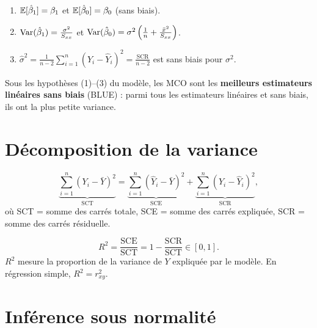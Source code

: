 \begin{theoreme}
\label{thm:mco-props}
\begin{enumerate}
\item $\mathbb{E}[\hat{\beta}_1]=\beta_1$ et $\mathbb{E}[\hat{\beta}_0]=\beta_0$ (sans biais).
\item $\operatorname{Var}(\hat{\beta}_1)=\frac{\sigma^2}{S_{xx}}$ et $\operatorname{Var}(\hat{\beta}_0)=\sigma^2\left(\frac{1}{n}+\frac{\bar{x}^2}{S_{xx}}\right)$.
\item $\hat{\sigma}^2=\frac{1}{n-2}\sum_{i=1}^n(Y_i-\hat{Y}_i)^2=\frac{\mathrm{SCR}}{n-2}$ est sans biais pour $\sigma^2$.
\end{enumerate}
\end{theoreme}

\begin{theoreme}
Sous les hypoth\`eses (1)--(3) du mod\`ele, les MCO sont les \textbf{meilleurs estimateurs lin\'eaires sans biais} (BLUE) : parmi tous les estimateurs lin\'eaires et sans biais, ils ont la plus petite variance.
\end{theoreme}

\section{D\'ecomposition de la variance}

\begin{theoreme}[D\'ecomposition SCT = SCE + SCR]
\[
\underbrace{\sum_{i=1}^n(Y_i-\bar{Y})^2}_{\mathrm{SCT}} = \underbrace{\sum_{i=1}^n(\hat{Y}_i-\bar{Y})^2}_{\mathrm{SCE}} + \underbrace{\sum_{i=1}^n(Y_i-\hat{Y}_i)^2}_{\mathrm{SCR}},
\]
o\`u SCT = somme des carr\'es totale, SCE = somme des carr\'es expliqu\'ee, SCR = somme des carr\'es r\'esiduelle.
\end{theoreme}

\begin{definition}
\[
R^2 = \frac{\mathrm{SCE}}{\mathrm{SCT}} = 1-\frac{\mathrm{SCR}}{\mathrm{SCT}} \in[0,1].
\]
$R^2$ mesure la proportion de la variance de $Y$ expliqu\'ee par le mod\`ele. En r\'egression simple, $R^2=r_{xy}^2$.
\end{definition}

\section{Inf\'erence sous normalit\'e}

